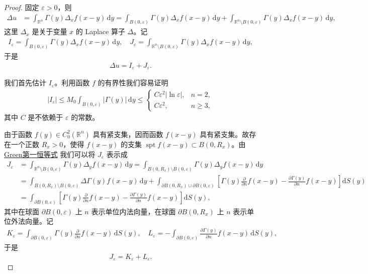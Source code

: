 \documentclass[../../main.tex]{subfiles}%
\begin{document}
\begin{proof}
固定 $\varepsilon>0$，则
\begin{align*}
\Delta u &= \int_{\mathbb{R}^n} \varGamma (y)\Delta_x f(x-y)\,\mathrm{d}y = \int_{B(0,\varepsilon)} \varGamma (y)\Delta_x f(x-y)\,\mathrm{d}y + \int_{\mathbb{R}^n\setminus B(0,\varepsilon)} \varGamma (y)\Delta_x f(x-y)\,\mathrm{d}y,
\end{align*}
这里 $\Delta_x$ 是关于变量 $x$ 的 Laplace 算子 $\Delta$。记
\begin{align*}
I_\varepsilon = \int_{B(0,\varepsilon)} \varGamma (y)\Delta_x f(x-y)\,\mathrm{d}y, \quad J_\varepsilon = \int_{\mathbb{R}^n\setminus B(0,\varepsilon)} \varGamma (y)\Delta_x f(x-y)\,\mathrm{d}y,
\end{align*}
于是
\begin{align*}
\Delta u = I_\varepsilon + J_\varepsilon.
\end{align*}

我们首先估计 $I_\varepsilon$。利用函数 $f$ 的有界性我们容易证明
\begin{align}
|I_\varepsilon| \leqslant M_0 \int_{B(0,\varepsilon)} |\varGamma (y)|\,\mathrm{d}y
\leqslant \begin{cases}
C\varepsilon^2|\ln\varepsilon|, & n=2, \\
C\varepsilon^2, & n\geqslant 3,
\end{cases} \label{eq:Ieps}
\end{align}
其中 $C$ 是不依赖于 $\varepsilon$ 的常数。

由于函数 $f(y)\in C_0^2(\mathbb{R}^n)$ 具有紧支集，因而函数 $f(x-y)$ 具有紧支集。故存在一个正数 $R_x>0$，使得 $f(x-y)$ 的支集 $\operatorname{spt} f(x-y)\subset B(0,R_x)$。由\hyperref[Basis of Analytics-theorem:Green第一恒等式]{Green第一恒等式} 我们可以将 $J_\varepsilon$ 表示成
\begin{align*}
J_\varepsilon &= \int_{\mathbb{R}^n\setminus B(0,\varepsilon)} \varGamma (y)\Delta_y f(x-y)\,\mathrm{d}y 
= \int_{B(0,R_x)\setminus B(0,\varepsilon)} \varGamma (y)\Delta_y f(x-y)\,\mathrm{d}y \\
&= \int_{B(0,R_x)\setminus B(0,\varepsilon)} \Delta\varGamma (y) f(x-y)\,\mathrm{d}y + \int_{\partial B(0,R_x)\cup\partial B(0,\varepsilon)} \left[ \varGamma (y)\frac{\partial}{\partial n} f(x-y) - \frac{\partial\varGamma (y)}{\partial n} f(x-y) \right] \mathrm{d}S(y) \\
&= \int_{\partial B(0,\varepsilon)} \left[ \varGamma (y)\frac{\partial}{\partial n} f(x-y) - \frac{\partial\varGamma (y)}{\partial n} f(x-y) \right] \mathrm{d}S(y),
\end{align*}
其中在球面 $\partial B(0,\varepsilon)$ 上 $n$ 表示单位内法向量，在球面 $\partial B(0,R_x)$ 上 $n$ 表示单位外法向量。记
\begin{align*}
K_\varepsilon = \int_{\partial B(0,\varepsilon)} \varGamma (y)\frac{\partial}{\partial n} f(x-y)\,\mathrm{d}S(y), \quad 
L_\varepsilon = -\int_{\partial B(0,\varepsilon)} \frac{\partial\varGamma (y)}{\partial n} f(x-y)\,\mathrm{d}S(y),
\end{align*}
于是
\begin{align*}
J_\varepsilon = K_\varepsilon + L_\varepsilon.
\end{align*}


\end{proof}
\end{document}
